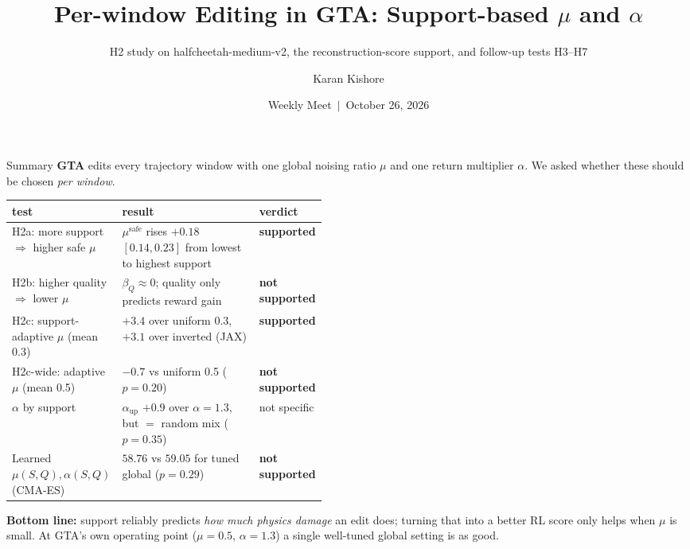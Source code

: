 \documentclass[aspectratio=169,11pt]{beamer}
\title[GTA $\rightarrow$ per-window $\mu$, $\alpha$ $\rightarrow$ results so far]{Per-window Editing in GTA: Support-based $\mu$ and $\alpha$}
\subtitle{H2 study on halfcheetah-medium-v2, the reconstruction-score support, and follow-up tests H3--H7}
\author{Karan Kishore}
\institute{IIT Madras}
\date{Weekly Meet \,$|$\, October 26, 2026}
\newcommand{\yes}{\textcolor{ok}{\textbf{supported}}}
\newcommand{\nope}{\textcolor{no}{\textbf{not supported}}}
\begin{document}
\begin{frame}
\titlepage
\end{frame}

\begin{frame}[shrink=18]{Summary}
\small
\textbf{GTA} edits every trajectory window with one global noising ratio $\mu$ and one return multiplier $\alpha$.
We asked whether these should be chosen \emph{per window}.
\vspace{0.4em}

\renewcommand{\arraystretch}{1.15}
\begin{tabularx}{\linewidth}{@{}p{0.33\linewidth}Yp{0.13\linewidth}@{}}
\toprule
test & result & verdict\\
\midrule
H2a: more support $\Rightarrow$ higher safe $\mu$ & $\mu^{\text{safe}}$ rises $+0.18$ $[0.14,0.23]$ from lowest to highest support & \yes\\
H2b: higher quality $\Rightarrow$ lower $\mu$ & $\beta_Q\approx0$; quality only predicts reward gain & \nope\\
H2c: support-adaptive $\mu$ (mean 0.3) & $+3.4$ over uniform 0.3, $+3.1$ over inverted (JAX) & \yes\\
H2c-wide: adaptive $\mu$ (mean 0.5) & $-0.7$ vs uniform 0.5 ($p=0.20$) & \nope\\
$\alpha$ by support & $\alpha_{\text{up}}$ $+0.9$ over $\alpha=1.3$, but $=$ random mix ($p=0.35$) & not specific\\
Learned $\mu(S,Q),\alpha(S,Q)$ (CMA-ES) & $58.76$ vs $59.05$ for tuned global ($p=0.29$) & \nope\\
\bottomrule
\end{tabularx}
\vspace{0.4em}

\textbf{Bottom line:} support reliably predicts \emph{how much physics damage} an edit does; turning that into a better RL score
only helps when $\mu$ is small. At GTA's own operating point ($\mu=0.5$, $\alpha=1.3$) a single well-tuned global setting is as good.
\end{frame}
\end{document}
